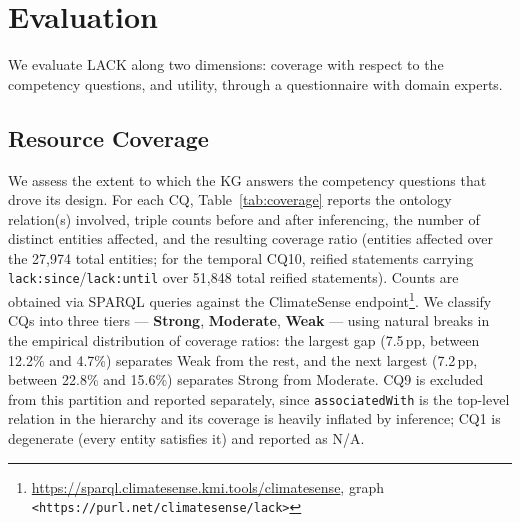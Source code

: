 \vspace{-0.3cm}\section{Evaluation}
\label{sec:evaluation}
We evaluate LACK along two dimensions: coverage with respect to the competency questions, and utility, through a questionnaire with domain experts.
\subsection{Resource Coverage}
We assess the extent to which the KG answers the competency questions that drove its design.
For each CQ, Table~\ref{tab:coverage} reports the ontology relation(s) involved, triple counts before and after inferencing, the number of distinct entities affected, and the resulting coverage ratio (entities affected over the 27{,}974 total entities; for the temporal CQ10, reified statements carrying \texttt{lack:since}/\texttt{lack:until} over 51{,}848 total reified statements). Counts are obtained via SPARQL queries against the ClimateSense endpoint\footnote{\url{https://sparql.climatesense.kmi.tools/climatesense}, graph \texttt{<https://purl.net/climatesense/lack>}}.
We classify CQs into three tiers --- \textbf{Strong}, \textbf{Moderate}, \textbf{Weak} --- using natural breaks in the empirical distribution of coverage ratios: the largest gap (7.5\,pp, between 12.2\% and 4.7\%) separates Weak from the rest, and the next largest (7.2\,pp, between 22.8\% and 15.6\%) separates Strong from Moderate.
CQ9 is excluded from this partition and reported separately, since \texttt{associatedWith} is the top-level relation in the hierarchy and its coverage is heavily inflated by inference; CQ1 is degenerate (every entity satisfies it) and reported as N/A.




